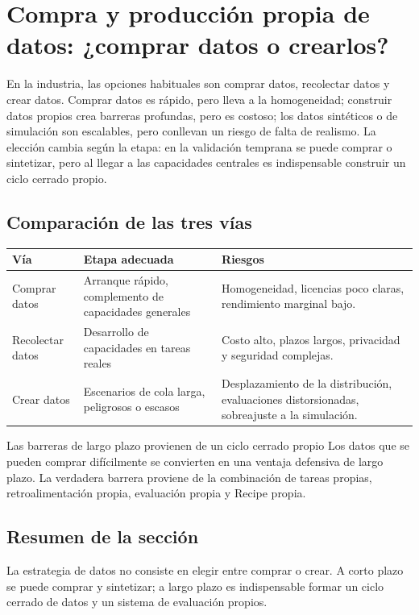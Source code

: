 \section{Compra y producción propia de datos: ¿comprar datos o crearlos?}

En la industria, las opciones habituales son comprar datos, recolectar datos y crear datos. Comprar datos es rápido, pero lleva a la homogeneidad; construir datos propios crea barreras profundas, pero es costoso; los datos sintéticos o de simulación son escalables, pero conllevan un riesgo de falta de realismo. La elección cambia según la etapa: en la validación temprana se puede comprar o sintetizar, pero al llegar a las capacidades centrales es indispensable construir un ciclo cerrado propio.

\subsection{Comparación de las tres vías}

\noindent\begin{tabularx}{\textwidth}{p{}p{}X}
\toprule
Vía & Etapa adecuada & Riesgos \\
\midrule
Comprar datos & Arranque rápido, complemento de capacidades generales & Homogeneidad, licencias poco claras, rendimiento marginal bajo. \\
Recolectar datos & Desarrollo de capacidades en tareas reales & Costo alto, plazos largos, privacidad y seguridad complejas. \\
Crear datos & Escenarios de cola larga, peligrosos o escasos & Desplazamiento de la distribución, evaluaciones distorsionadas, sobreajuste a la simulación. \\
\bottomrule
\end{tabularx}

\begin{importantbox}{Las barreras de largo plazo provienen de un ciclo cerrado propio}
Los datos que se pueden comprar difícilmente se convierten en una ventaja defensiva de largo plazo. La verdadera barrera proviene de la combinación de tareas propias, retroalimentación propia, evaluación propia y Recipe propia.
\end{importantbox}

\subsection{Resumen de la sección}

La estrategia de datos no consiste en elegir entre comprar o crear. A corto plazo se puede comprar y sintetizar; a largo plazo es indispensable formar un ciclo cerrado de datos y un sistema de evaluación propios.
